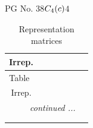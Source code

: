 \documentclass[fleqn,8pt,landscape]{jsarticle}
\begin{document}
\setcounter{MaxMatrixCols}{32}

\renewcommand{\tablename}{Table~}
\renewcommand{\figurename}{Figure~}
\begin{center}
\LARGE
PG No. 38\quad$C_{\rm 4}(c)$\quad$4$\quad[ tetragonal ]
\end{center}
\renewcommand{\arraystretch}{1.2}
\begin{longtable}{ccccccc}
\caption{Representation matrices}
 \\
 \hline \hline
Irrep. &  &  &  &  &  &  \\ \hline \endfirsthead

\multicolumn{6}{l}{\tablename\ \thetable{}} \\
 \hline \hline
Irrep. &  &  &  &  &  &  \\ \hline \endhead

 \hline \hline
\multicolumn{6}{r}{\footnotesize\it continued ...} \\ \endfoot

 \hline \hline
\multicolumn{6}{r}{} \\ \endlastfoot


\end{longtable}
\end{document}
